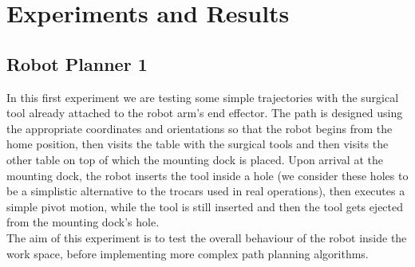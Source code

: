 \section{Experiments and Results}

\subsection{Robot Planner 1}

In this first experiment we are testing some simple trajectories with the surgical tool already attached to the robot arm's end effector.
The path is designed using the appropriate coordinates and orientations so that the robot begins from the home position, then visits the table with the surgical 
tools and then visits the other table on top of which the mounting dock is placed. Upon arrival at the mounting dock, the robot inserts the tool inside a hole
(we consider these holes to be a simplistic alternative to the trocars used in real operations), then executes a simple pivot motion, while the tool is still 
inserted and then the tool gets ejected from the mounting dock's hole.\\

The aim of this experiment is to test the overall behaviour of the robot inside the work space, before implementing more complex path planning algorithms.

